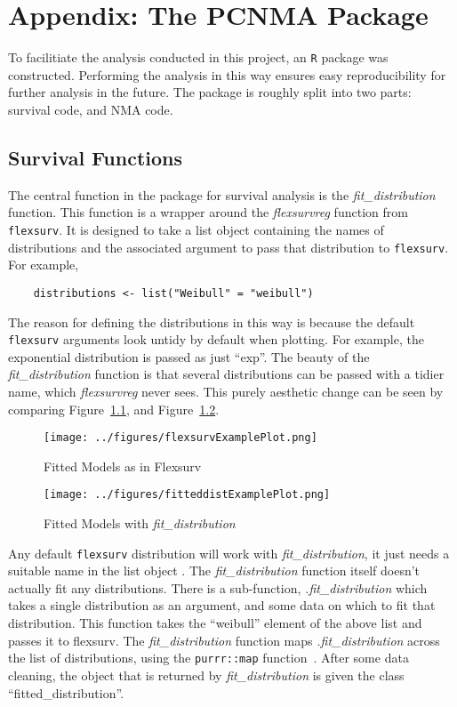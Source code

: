 \chapter{Appendix: The PCNMA Package}\label{pack}

To facilitiate the analysis conducted in this project, an \verb|R| package was constructed. Performing the analysis in this way ensures easy reproducibility for further analysis in the future. The package is roughly split into two parts: survival code, and NMA code. 

\section{Survival Functions}
The central function in the package for survival analysis is the \textit{fit\_distribution} function. This function is a wrapper around the \textit{flexsurvreg} function from \verb|flexsurv|. It is designed to take a list object containing the names of distributions and the associated argument to pass that distribution to \verb|flexsurv|. For example, 

\begin{lstlisting}
    distributions <- list("Weibull" = "weibull")
\end{lstlisting}

The reason for defining the distributions in this way is because the default \verb|flexsurv| arguments look untidy by default when plotting. For example, the exponential distribution is passed as just ``exp''. The beauty of the \textit{fit\_distribution} function is that several distributions can be passed with a tidier name, which \textit{flexsurvreg} never sees. This purely aesthetic change can be seen by comparing Figure~\ref{fig:flexsurvlabelexample}, and Figure~\ref{fig:fitdistributionexampleplot}. \\

\begin{figure}[h]
    \texttt{[image: ../figures/flexsurvExamplePlot.png]}
    \caption{Fitted Models as in Flexsurv}
    \label{fig:flexsurvlabelexample}
\end{figure}

\begin{figure}[h]
    \texttt{[image: ../figures/fitteddistExamplePlot.png]}
    \caption{Fitted Models with \textit{fit\_distribution}}
    \label{fig:fitdistributionexampleplot}
\end{figure}

Any default \verb|flexsurv| distribution will work with \textit{fit\_distribution}, it just needs a suitable name in the list object . The \textit{fit\_distribution} function itself doesn't actually fit any distributions. There is a sub-function, \textit{.fit\_distribution} which takes a single distribution as an argument, and some data on which to fit that distribution. This function takes the ``weibull'' element of the above list and passes it to flexsurv. The \textit{fit\_distribution} function maps \textit{.fit\_distribution} across the list of distributions, using the \verb|purrr::map| function~\cite{purrr}. After some data cleaning, the object that is returned by \textit{fit\_distribution} is given the class ``fitted\_distribution''.  \\

